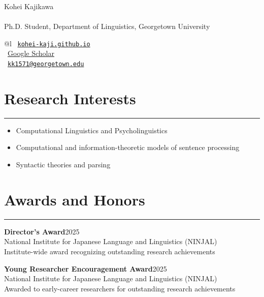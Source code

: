 \documentclass[10pt,a4paper]{article}
\newcommand{\entrygap}{\vspace{6pt}}
\newcommand{\rulegap}{\vspace{6pt}}
\begin{document}
\noindent
\begin{minipage}[c]{0.7\textwidth}
    {\huge Kohei Kajikawa} \\
    \vspace{-12pt} \\
    \large Ph.D. Student, Department of Linguistics, Georgetown University
\end{minipage}
\hfill
\begin{minipage}[c]{0.3\textwidth}
    \flushright
    \small
    \begin{tabular}{@{}l}
        \faHome \ \href{https://kohei-kaji.github.io}{\texttt{kohei-kaji.github.io}} \\
        \aiGoogleScholar \ \href{https://scholar.google.com/citations?view_op=list_works&hl=en&user=olviCecAAAAJ}{Google Scholar} \\
        \faEnvelope \ \href{mailto:kk1571@georgetown.edu}{\texttt{kk1571@georgetown.edu}}
    \end{tabular}
\end{minipage}

\vspace{10pt}

\section*{Research Interests}
\hrule
\rulegap
\begin{itemize}
    \item Computational Linguistics and Psycholinguistics
    \item Computational and information-theoretic models of sentence processing
    \item Syntactic theories and parsing
\end{itemize}



\section*{Awards and Honors}
\hrule
\rulegap

\textbf{Director's Award}\hfill{2025} \\
National Institute for Japanese Language and Linguistics (NINJAL) \\
Institute-wide award recognizing outstanding research achievements

\entrygap

\textbf{Young Researcher Encouragement Award}\hfill{2025} \\
National Institute for Japanese Language and Linguistics (NINJAL) \\
Awarded to early-career researchers for outstanding research achievements
\end{document}
